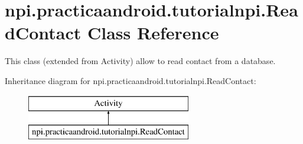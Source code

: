 \hypertarget{classnpi_1_1practicaandroid_1_1tutorialnpi_1_1_read_contact}{\section{npi.\-practicaandroid.\-tutorialnpi.\-Read\-Contact Class Reference}
\label{classnpi_1_1practicaandroid_1_1tutorialnpi_1_1_read_contact}
}


This class (extended from Activity) allow to read contact from a database.  


Inheritance diagram for npi.\-practicaandroid.\-tutorialnpi.\-Read\-Contact\-:\begin{figure}[H]
\begin{center}
\leavevmode
\includegraphics[height=2.000000cm]{classnpi_1_1practicaandroid_1_1tutorialnpi_1_1_read_contact}
\end{center}
\end{figure}
